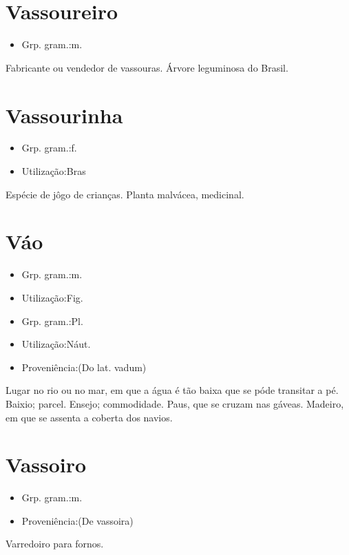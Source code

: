 \documentclass{article}
\begin{document}
\section{Vassoureiro}
\begin{itemize}
\item {Grp. gram.:m.}
\end{itemize}
Fabricante ou vendedor de vassouras.
Árvore leguminosa do Brasil.
\section{Vassourinha}
\begin{itemize}
\item {Grp. gram.:f.}
\end{itemize}
\begin{itemize}
\item {Utilização:Bras}
\end{itemize}
Espécie de jôgo de crianças.
Planta malvácea, medicinal.
\section{Váo}
\begin{itemize}
\item {Grp. gram.:m.}
\end{itemize}
\begin{itemize}
\item {Utilização:Fig.}
\end{itemize}
\begin{itemize}
\item {Grp. gram.:Pl.}
\end{itemize}
\begin{itemize}
\item {Utilização:Náut.}
\end{itemize}
\begin{itemize}
\item {Proveniência:(Do lat. \textunderscore vadum\textunderscore )}
\end{itemize}
Lugar no rio ou no mar, em que a água é tão baixa que se póde transitar a pé.
Baixio; parcel.
Ensejo; commodidade.
Paus, que se cruzam nas gáveas.
Madeiro, em que se assenta a coberta dos navios.
\section{Vassoiro}
\begin{itemize}
\item {Grp. gram.:m.}
\end{itemize}
\begin{itemize}
\item {Proveniência:(De \textunderscore vassoira\textunderscore )}
\end{itemize}
Varredoiro para fornos.
\end{document}
